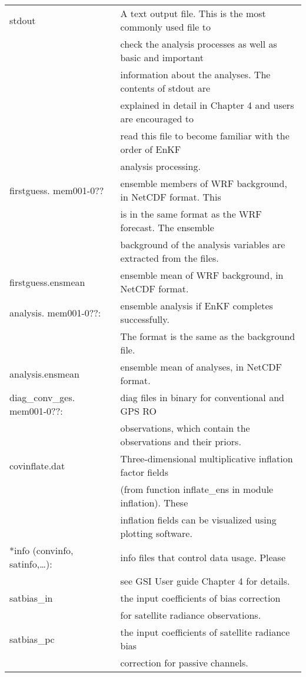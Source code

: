 \begin{table}[htbp]
\centering
\begin{tabular}{| l | l |}
\hline
stdout  &  A text output file. This is the most commonly used file to \\
             & check the analysis processes as well as basic and important \\
             &  information about the analyses. The contents of stdout are \\
             & explained in detail in Chapter 4 and users are encouraged to \\
             & read this file to become familiar with the order of EnKF  \\
             &   analysis processing.  \\
             \hline
firstguess. mem001-0??  &  ensemble members of WRF background, in NetCDF format. This \\
              &  is in the same format as the WRF forecast. The ensemble \\ 
               &  background of the analysis variables are extracted from the files.  \\
               \hline
firstguess.ensmean  &  ensemble mean of WRF background, in NetCDF format.  \\
\hline
 analysis. mem001-0??:  &  ensemble analysis if EnKF completes successfully.  \\
                                &  The format is the same as the background file.  \\   
                                \hline
  analysis.ensmean &  ensemble mean of analyses, in NetCDF format. \\
  \hline
   diag\_conv\_ges. mem001-0??:  &  diag files in binary for conventional and GPS RO \\
             &    observations, which contain the observations and their priors.       \\
             \hline 
  covinflate.dat  & Three-dimensional multiplicative inflation factor fields \\
  &  (from function inflate\_ens in module inflation). These  \\
    &  inflation fields can be visualized using plotting software.  \\      
    \hline
    *info (convinfo, satinfo,\ldots):  &  info files that control data usage. Please \\
    &  see GSI User guide Chapter 4 for details.\\
         \hline
      satbias\_in  & the input coefficients of bias correction \\
      & for satellite radiance observations.\\       
      \hline
        satbias\_pc    &  the input coefficients of satellite radiance bias \\
        &  correction for passive channels.\\        
        \hline                 
\end{tabular}
\end{table}

    
    
